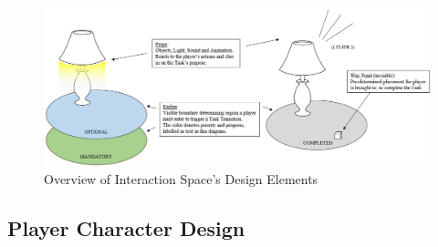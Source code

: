     \begin{figure}[ht]
        \hspace*{-3cm}                                                           
            \includegraphics[width=0.95\paperwidth]{figures/InteractionSpaceDesign.png}
            \caption{\label{fig:FigureInteractionSpace}Overview of Interaction Space's Design Elements}               
    \end{figure}
    

\subsection{Player Character Design} \label{sec:develop_character}

